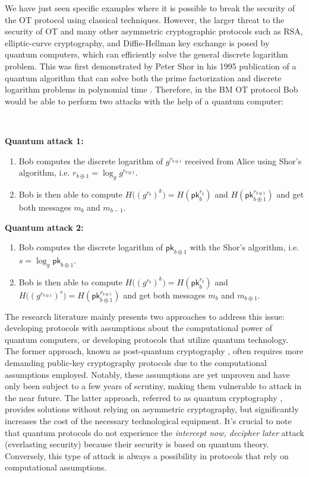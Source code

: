 We have just seen specific examples where it is possible to break the security of the OT protocol using classical techniques. However, the larger threat to the security of OT and many other asymmetric cryptographic protocols such as RSA, elliptic-curve cryptography, and Diffie-Hellman key exchange is posed by quantum computers, which can efficiently solve the general discrete logarithm problem. This was first demonstrated by Peter Shor in his 1995 publication of a quantum algorithm that can solve both the prime factorization and discrete logarithm problems in polynomial time \cite{Sho95}. Therefore, in the BM OT protocol Bob would be able to perform two attacks with the help of a quantum computer:


\

\textbf{Quantum attack 1:}
\begin{enumerate}
    \item Bob computes the discrete logarithm of $g^{r_{b\oplus 1}}$ received from Alice using Shor's algorithm, i.e. $r_{b\oplus 1} = \log_g g^{r_{b\oplus 1}}$.
    \item Bob is then able to compute $H\big((g^{r_b})^k\big) = H(\mathsf{pk}_b^{r_b})$ and $H(\mathsf{pk}_{b\oplus 1}^{r_{b\oplus 1}})$ and get both messages $m_b$ and $m_{b-1}$.
\end{enumerate}

\textbf{Quantum attack 2:}
\begin{enumerate}
    \item Bob computes the discrete logarithm of $\mathsf{pk}_{b\oplus 1}$ with the Shor's algorithm, i.e. $s = \log_g \mathsf{pk}_{b\oplus 1}$.
    \item Bob is then able to compute $H\big((g^{r_b})^k\big) = H(\mathsf{pk}_b^{r_b})$ and $H\big((g^{r_{b\oplus 1}})^s\big) = H(\mathsf{pk}_{b\oplus 1}^{r_{b\oplus 1}})$ and get both messages $m_b$ and $m_{b\oplus 1}$.
\end{enumerate}

The research literature mainly presents two approaches to address this issue: developing protocols with assumptions about the computational power of quantum computers, or developing protocols that utilize quantum technology. The former approach, known as post-quantum cryptography \cite{Bernstein2017}, often requires more demanding public-key cryptography protocols due to the computational assumptions employed. Notably, these assumptions are yet unproven and have only been subject to a few years of scrutiny, making them vulnerable to attack in the near future. The latter approach, referred to as quantum cryptography \cite{Pirandola2020}, provides solutions without relying on asymmetric cryptography, but significantly increases the cost of the necessary technological equipment. It's crucial to note that quantum protocols do not experience the \textit{intercept now, decipher later} attack (everlasting security) because their security is based on quantum theory. Conversely, this type of attack is always a possibility in protocols that rely on computational assumptions.


